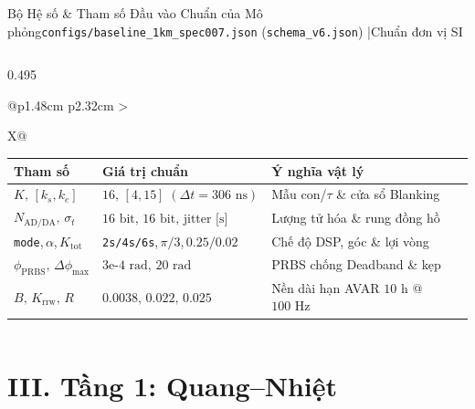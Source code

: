 \documentclass[aspectratio=169,8pt]{beamer}
\begin{document}
\begin{frame}{Bộ Hệ số \& Tham số Đầu vào Chuẩn của Mô phỏng}{\texttt{configs/baseline\_1km\_spec007.json} (\texttt{schema\_v6.json}) \enspace|\enspace Chuẩn đơn vị SI}
\begin{columns}[T]
\begin{column}{0.495\textwidth}
\begin{remarkbox}
\begin{tabularx}{\linewidth}{@{}p{1.48cm} p{2.32cm} >{\raggedright\arraybackslash}X@{}}
      \end{tabularx}
    \end{remarkbox}
    \vspace{0.10cm}
    \begin{notebox}
      \tiny\setlength{\tabcolsep}{2.2pt}\renewcommand{\arraystretch}{1.16}
      \begin{tabularx}{\linewidth}{@{}p{1.48cm} p{2.32cm} >{\raggedright\arraybackslash}X@{}}
        \textbf{Tham số} & \textbf{Giá trị chuẩn} & \textbf{Ý nghĩa vật lý} \\
        \midrule
        $K,\,[k_s,k_e]$ & $16,\,[4,15]\;(\Delta t{=}306\text{ ns})$ & Mẫu con/$\tau$ \& cửa sổ Blanking \\
        $N_{\text{AD/DA}},\,\sigma_t$ & $16\text{ bit},\,16\text{ bit},\,\text{jitter [s]}$ & Lượng tử hóa \& rung đồng hồ \\
        \texttt{mode},\,$\alpha$,\,$K_{\text{tot}}$ & \texttt{2s/4s/6s},\,$\pi/3$,\,$0.25/0.02$ & Chế độ DSP, góc \& lợi vòng \\
        $\phi_{\text{PRBS}},\,\Delta\phi_{\max}$ & $3\text{e-}4\text{ rad},\,20\text{ rad}$ & PRBS chống Deadband \& kẹp \\
        $B,\,K_{\text{rrw}},\,R$ & $0.0038,\,0.022,\,0.025$ & Nền dài hạn AVAR $10\text{ h}$ @ $100\text{ Hz}$ \\
      \end{tabularx}
    \end{notebox}
  \end{column}
\end{columns}
\end{frame}

\section{III. Tầng 1: Quang–Nhiệt}
\end{document}
